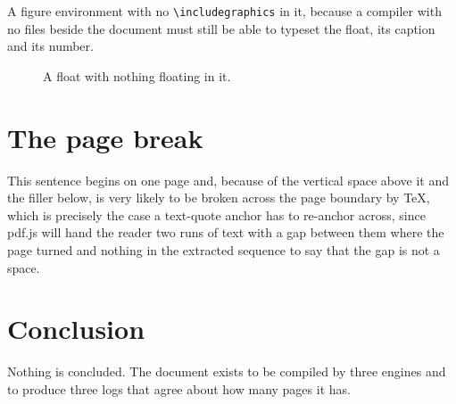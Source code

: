 \documentclass[11pt]{article}
\begin{document}
A figure environment with no \verb|\includegraphics| in it, because a
compiler with no files beside the document must still be able to typeset the
float, its caption and its number.

\begin{figure}[h]
  \centering
  \caption{A float with nothing floating in it.}
  \label{fig:empty}
\end{figure}

\section{The page break}

\vspace{26em}

This sentence begins on one page and, because of the vertical space above it
and the filler below, is very likely to be broken across the page boundary by
\TeX{}, which is precisely the case a text-quote anchor has to re-anchor
across, since pdf.js will hand the reader two runs of text with a gap between
them where the page turned and nothing in the extracted sequence to say that
the gap is not a space.

\vspace{6em}

\section{Conclusion}

Nothing is concluded. The document exists to be compiled by three engines and
to produce three logs that agree about how many pages it has.



\end{document}
